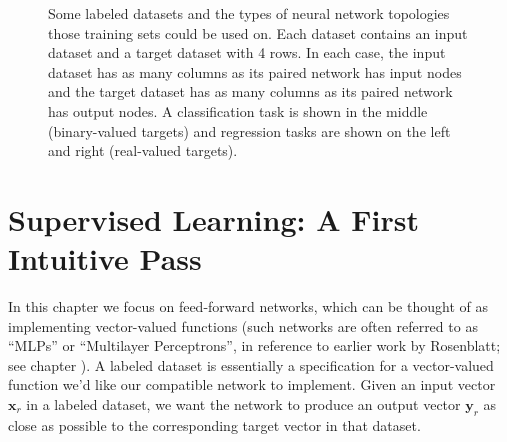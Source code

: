 \begin{figure}[h]
\centering
{}
\caption[Jeff Yoshimi.]{Some labeled datasets and the types of neural network topologies those training sets could be used on. Each dataset contains an input dataset and a target dataset with 4 rows. In each case, the input dataset has as many columns as its paired network has input nodes and the target dataset has as many columns as its paired network has output nodes. A classification task is shown in the middle (binary-valued targets) and regression tasks are shown on the left and right (real-valued targets).}
\label{tables_nets}
\end{figure}

\section{Supervised Learning: A First Intuitive Pass}\label{SupervisedFirstPass}

In this chapter we focus on feed-forward networks, which can be thought of as implementing vector-valued functions (such networks are often referred to as ``MLPs'' or ``Multilayer Perceptrons'', in reference to earlier work by Rosenblatt; see chapter ). A labeled dataset is essentially a specification for a vector-valued function we'd like our compatible network to implement. Given an input vector $\mathbf{x}_r$ in a labeled dataset, we want the network to produce an output vector $\mathbf{y}_r$ as close as possible to the corresponding target vector in that dataset.


